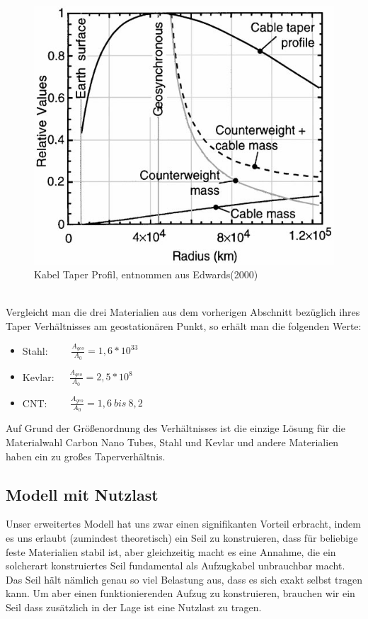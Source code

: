 \documentclass[a4paper, 10pt]{report}
\begin{document}
\begin{figure}[!htb]
\centering
\includegraphics[scale=0.4]{Tapering.png} 
\caption{Kabel Taper Profil, entnommen aus Edwards(2000)\cite{ED00}}
\label{fig:Tapering}
\end{figure}
\\
Vergleicht man die drei Materialien aus dem vorherigen Abschnitt bezüglich ihres Taper Verhältnisses am geostationären Punkt, so erhält man die folgenden Werte\cite{AR07}:

\begin{itemize}
\item Stahl: \ \ \ \ $\frac{A_{geo}}{A_0} = 1,6 *10^{33}$
\item Kevlar:\ \ \   $\frac{A_{geo}}{A_0} = 2,5 *10^8$
\item CNT: \ \ \ \ $\frac{A_{geo}}{A_0} = 1,6\ bis\ 8,2 $ 
\end{itemize}

Auf Grund der Größenordnung des Verhältnisses ist die einzige Lösung für die Materialwahl Carbon Nano Tubes, Stahl und Kevlar und andere Materialien haben ein zu großes Taperverhältnis.

\subsection{Modell mit Nutzlast}

Unser erweitertes Modell hat uns zwar einen signifikanten Vorteil erbracht, indem es uns erlaubt (zumindest theoretisch) ein Seil zu konstruieren, dass für beliebige feste Materialien stabil ist, aber gleichzeitig macht es eine Annahme, die ein solcherart konstruiertes Seil fundamental als Aufzugkabel unbrauchbar macht. Das Seil hält nämlich genau so viel Belastung aus, dass es sich exakt selbst tragen kann. Um aber einen funktionierenden Aufzug zu konstruieren, brauchen wir ein Seil dass zusätzlich in der Lage ist eine Nutzlast zu tragen.
\end{document}
